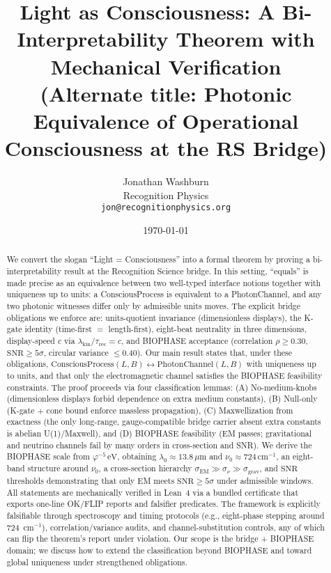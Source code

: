 \documentclass[12pt,a4paper]{article}
\title{Light as Consciousness: A Bi-Interpretability Theorem with Mechanical Verification\\
\large (Alternate title: Photonic Equivalence of Operational Consciousness at the RS Bridge)}
\author{Jonathan Washburn\\
Recognition Physics\\
\texttt{jon@recognitionphysics.org}}
\date{\today}
\begin{document}
\maketitle

\begin{abstract}
We convert the slogan ``Light = Consciousness'' into a formal theorem by proving a bi-interpretability result at the Recognition Science bridge. 
In this setting, ``equals'' is made precise as an equivalence between two well-typed interface notions together with uniqueness up to units: a ConsciousProcess is equivalent to a PhotonChannel, and any two photonic witnesses differ only by admissible units moves. 
The explicit bridge obligations we enforce are: units-quotient invariance (dimensionless displays), the K-gate identity (time-first \(=\) length-first), eight-beat neutrality in three dimensions, display-speed \(c\) via \(\lambda_{\mathrm{kin}}/\tau_{\mathrm{rec}}=c\), and BIOPHASE acceptance (correlation \(\rho\ge 0.30\), \(\mathrm{SNR}\ge 5\sigma\), circular variance \(\le 0.40\)). 
Our main result states that, under these obligations, \(\mathrm{ConsciousProcess}(L,B)\leftrightarrow \mathrm{PhotonChannel}(L,B)\) with uniqueness up to units, and that only the electromagnetic channel satisfies the BIOPHASE feasibility constraints. 
The proof proceeds via four classification lemmas: (A) No-medium-knobs (dimensionless displays forbid dependence on extra medium constants), (B) Null-only (K-gate + cone bound enforce massless propagation), (C) Maxwellization from exactness (the only long-range, gauge-compatible bridge carrier absent extra constants is abelian U(1)/Maxwell), and (D) BIOPHASE feasibility (EM passes; gravitational and neutrino channels fail by many orders in cross-section and SNR). 
We derive the BIOPHASE scale from \(\varphi^{-5}\,\mathrm{eV}\), obtaining \(\lambda_{0}\approx 13.8\,\mu\mathrm{m}\) and \(\nu_{0}\approx 724\,\mathrm{cm}^{-1}\), an eight-band structure around \(\nu_{0}\), a cross-section hierarchy \(\sigma_{\mathrm{EM}}\gg\sigma_{\nu}\gg\sigma_{\mathrm{grav}}\), and \(\mathrm{SNR}\) thresholds demonstrating that only EM meets \(\mathrm{SNR}\ge 5\sigma\) under admissible windows. 
All statements are mechanically verified in Lean~4 via a bundled certificate that exports one-line OK/FLIP reports and falsifier predicates. 
The framework is explicitly falsifiable through spectroscopy and timing protocols (e.g., eight-phase stepping around 724~cm\(^{-1}\)), correlation/variance audits, and channel-substitution controls, any of which can flip the theorem’s report under violation. 
Our scope is the bridge + BIOPHASE domain; we discuss how to extend the classification beyond BIOPHASE and toward global uniqueness under strengthened obligations.
\end{abstract}
\end{document}
